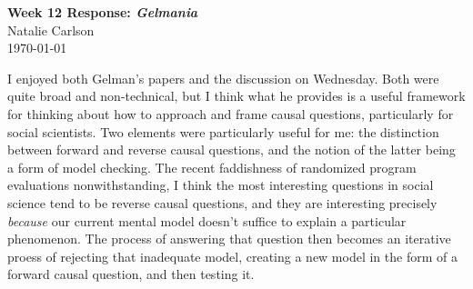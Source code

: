 \documentclass[12pt]{article}
\begin{document}
\begin{center}
  \Large \textbf{Week 12 Response: \textit{Gelmania}} \\
  \vspace{0.1in}
  \normalsize Natalie Carlson \\
  \today
\end{center}

I enjoyed both Gelman's papers and the discussion on Wednesday. Both were quite broad and non-technical, but I think what he provides is a useful framework for thinking about how to approach and frame causal questions, particularly for social scientists. Two elements were particularly useful for me: the distinction between forward and reverse causal questions, and the notion of the latter being a form of model checking. The recent faddishness of randomized program evaluations nonwithstanding, I think the most interesting questions in social science tend to be reverse causal questions, and they are interesting precisely \textit{because} our current mental model doesn't suffice to explain a particular phenomenon. The process of answering that question then becomes an iterative proess of rejecting that inadequate model, creating a new model in the form of a forward causal question, and then testing it. 
\end{document}
